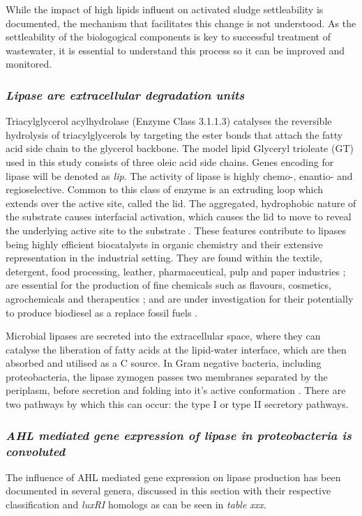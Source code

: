\documentclass[11pt]{article}
\begin{document}
While the impact of high lipids influent on activated sludge settleability is documented, the mechanism that facilitates this change is not understood. As the settleability of the biologogical components is key to successful treatment of wastewater, it is essential to understand this process so it can be improved and monitored.

\subsubsection{\emph{Lipase are extracellular degradation units}}
Triacylglycerol acylhydrolase (Enzyme Class 3.1.1.3) catalyses the reversible hydrolysis of triacylglycerols by targeting the ester bonds that attach the fatty acid side chain to the glycerol backbone. The model lipid Glyceryl trioleate (GT) used in this study consists of three oleic acid side chains. Genes encoding for lipase will be denoted as \emph{lip}.
The activity of lipase is highly chemo-, enantio- and regioselective. Common to this class of enzyme is an extruding loop which extends over the active site, called the lid. The aggregated, hydrophobic nature of the substrate causes interfacial activation, which causes the lid to move to reveal the underlying active site to the substrate \cite{derewenda1992,van_Tilbeurgh1993}. These features contribute to lipases being highly efficient biocatalysts in organic chemistry and their extensive representation in the industrial setting. 
They are found within the textile, detergent, food processing, leather, pharmaceutical, pulp and paper industries \cite{hasan_06}; are essential for the production of fine chemicals such as flavours, cosmetics, agrochemicals and therapeutics \cite{jaeger2002}; and are under investigation for their potentially to produce biodiesel as a replace fossil fuels \cite{hasan_06,iso2001}. 


Microbial lipases are secreted into the extracellular space, where they can catalyse the liberation of fatty acids at the lipid-water interface, which are then absorbed and utilised as a C source. In Gram negative bacteria, including proteobacteria, the lipase zymogen passes two membranes separated by the periplasm, before secretion and folding into it's active conformation \cite{bos2007,michel2009}. There are two pathways by which this can occur: the type I or type II secretory pathways. 


\subsubsection{\emph{AHL mediated gene expression of lipase in proteobacteria is convoluted}}
The influence of AHL mediated gene expression on lipase production has been documented in several genera, discussed in this section with their respective classification and \emph{luxRI} homologs as can be seen in \emph{table xxx}.
\end{document}
